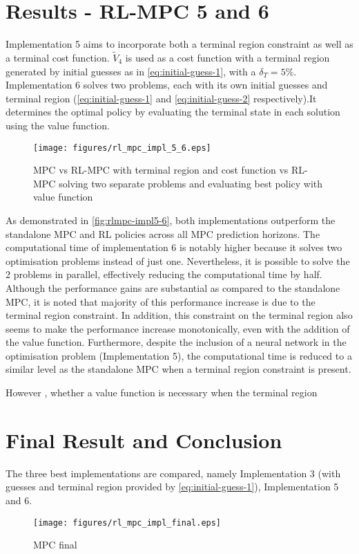 \section{Results - RL-MPC 5 and 6}
Implementation 5 aims to incorporate both a terminal region constraint as well as a terminal cost function. $\tilde{V}_4$ is used as a cost function with a terminal region generated by initial guesses as in \autoref{eq:initial-guess-1}, with a $\delta_T =5\%$. Implementation 6 solves two problems, each with its own initial guesses and terminal region (\autoref{eq:initial-guess-1} and \autoref{eq:initial-guess-2} respectively).It determines the optimal policy by evaluating the terminal state in each solution using the value function.
\begin{figure}[H]
	\centering
	\texttt{[image: figures/rl\_mpc\_impl\_5\_6.eps]}
	\caption{MPC vs RL-MPC with terminal region and cost function vs RL-MPC solving two separate problems and evaluating best policy with value function}
	\label{fig:rlmpc-impl5-6}
\end{figure}
As demonstrated in \autoref{fig:rlmpc-impl5-6}, both implementations outperform the standalone MPC and RL policies across all MPC prediction horizons. The computational time of implementation 6 is notably higher because it solves two optimisation problems instead of just one. Nevertheless, it is possible to solve the 2 problems in parallel, effectively reducing the computational time by half. Although the performance gains are substantial as compared to the standalone MPC, it is noted that majority of this performance increase is due to the terminal region constraint. In addition, this constraint on the terminal region also seems to make the performance increase monotonically, even with the addition of the value function. Furthermore, despite the inclusion of a neural network in the optimisation problem (Implementation 5), the computational time is reduced to a similar level as the standalone MPC when a terminal region constraint is present. 


However , whether a value function is necessary when the terminal region
\section{Final Result and Conclusion} \label{section:final-rl-mpc-nominal}
The three best implementations are compared, namely Implementation 3 (with guesses and terminal region provided by \autoref{eq:initial-guess-1}), Implementation 5 and 6.
\begin{figure}[H]
	\centering
	\texttt{[image: figures/rl\_mpc\_impl\_final.eps]}
	\caption{MPC final }
	\label{fig:rlmpc-final}
\end{figure}

